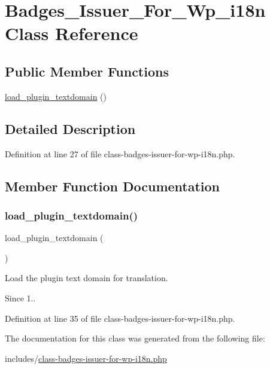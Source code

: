 \hypertarget{class_badges___issuer___for___wp__i18n}{}\section{Badges\+\_\+\+Issuer\+\_\+\+For\+\_\+\+Wp\+\_\+i18n Class Reference}
\label{class_badges___issuer___for___wp__i18n}
\subsection*{Public Member Functions}
\begin{DoxyCompactItemize}
\item 
\hyperlink{class_badges___issuer___for___wp__i18n_a9863949797e125d009862bb63817504c}{load\+\_\+plugin\+\_\+textdomain} ()
\end{DoxyCompactItemize}


\subsection{Detailed Description}


Definition at line 27 of file class-\/badges-\/issuer-\/for-\/wp-\/i18n.\+php.



\subsection{Member Function Documentation}
\mbox{\label{class_badges___issuer___for___wp__i18n_a9863949797e125d009862bb63817504c}} 
\subsubsection{\texorpdfstring{load\+\_\+plugin\+\_\+textdomain()}{load\_plugin\_textdomain()}}
{\footnotesize\ttfamily load\+\_\+plugin\+\_\+textdomain (\begin{DoxyParamCaption}{ }\end{DoxyParamCaption})}

Load the plugin text domain for translation.

\begin{DoxySince}{Since}
1.. 
\end{DoxySince}


Definition at line 35 of file class-\/badges-\/issuer-\/for-\/wp-\/i18n.\+php.



The documentation for this class was generated from the following file\+:\begin{DoxyCompactItemize}
\item 
includes/\hyperlink{class-badges-issuer-for-wp-i18n_8php}{class-\/badges-\/issuer-\/for-\/wp-\/i18n.\+php}\end{DoxyCompactItemize}
